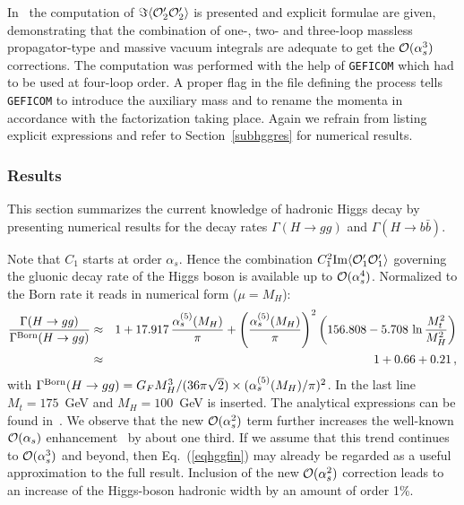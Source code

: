 In~\cite{Che97higgs} the computation of
$\Im\langle{\cal O}_2^\prime{\cal O}_2^\prime\rangle$
is presented and explicit formulae are given, demonstrating
that the combination of one-, two- and three-loop
massless propagator-type and massive vacuum integrals are
adequate to get the ${\cal O}(\alpha_s^3)$ corrections.
The computation was performed with the help of {\tt GEFICOM}
which had to be used at four-loop order.
A proper flag in the file defining the process tells
{\tt GEFICOM} to introduce the auxiliary mass and to rename
the momenta in accordance with the factorization taking place.
Again we refrain from listing explicit expressions and refer
to Section~\ref{subhggres} for numerical results.


\subsubsection{\label{subhggres}Results}

This section summarizes the current knowledge of hadronic Higgs decay by
presenting numerical results for the decay rates $\Gamma(H\to gg)$ and
$\Gamma(H\to b\bar{b})$.

Note that $C_1$ starts at order $\alpha_s$. Hence the combination
$C_1^2\mbox{Im}\langle {\cal O}_1^\prime {\cal O}_1^\prime\rangle$
governing the gluonic decay rate of the Higgs boson is available up to
${\cal O}(\alpha_s^4)$. Normalized to the Born rate it reads 
in numerical form ($\mu=M_H$):
\begin{eqnarray}
\frac{\Gamma(H\to gg)}{\Gamma^{\rm Born}(H\to gg)}
&\approx&
1+17.917\,\frac{\alpha_s^{(5)}(M_H)}{\pi}
+\left(\frac{\alpha_s^{(5)}(M_H)}{\pi}\right)^2
\left(156.808-5.708\,\ln\frac{M_t^2}{M_H^2}\right)
\nonumber\\
&\approx&
1+0.66+0.21
\,,
\label{eqhggfin}
\end{eqnarray}
with $\Gamma^{\rm Born}(H\to gg)
      =G_FM_H^3/(36\pi\sqrt2) \times (\alpha_s^{(5)}(M_H)/\pi)^2$.
In the last line $M_t=175$~GeV and $M_H=100$~GeV is inserted.
The analytical expressions can be found in~\cite{CheKniSte97hgg}.
We observe that the new ${\cal O}(\alpha_s^2)$ term further increases the
well-known ${\cal O}(\alpha_s)$ 
enhancement~\cite{InaKubOka83,DjoSpiZer91} by about one third.
If we assume that this trend continues to ${\cal O}(\alpha_s^3)$ and beyond,
then Eq.~(\ref{eqhggfin})
may already be regarded as a useful approximation to the
full result.
Inclusion of the new ${\cal O}(\alpha_s^2)$ correction leads to an increase of 
the Higgs-boson hadronic width by an amount of order 1\%.

